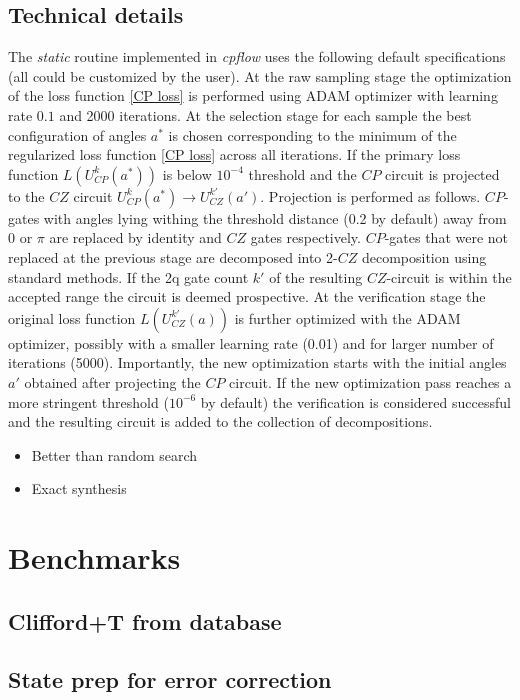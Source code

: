 \documentclass[amsfonts, amssymb, aps, nofootinbib]{revtex4-2}
\newcommand{\cpflow}{\textit{cpflow }}
\begin{document}
\subsection{Technical details}
The \textit{static} routine implemented in \cpflow uses the following default specifications (all could be customized by the user). At the raw sampling stage the optimization of the loss function \eqref{CP loss} is performed using ADAM\cite{} optimizer with learning rate $0.1$ and 2000 iterations. At the selection stage for each sample the best configuration of angles $a^*$ is chosen corresponding to the minimum of the regularized loss function \eqref{CP loss} across all iterations. If the primary loss function $L(U_{CP}^k(a^*))$ is below $10^{-4}$ threshold and the $CP$ circuit is projected to the $CZ$ circuit $U_{CP}^k(a^*)\to U_{CZ}^{k'}(a')$. Projection is performed as follows. $CP$-gates with angles lying withing the threshold distance (0.2 by default) away from $0$ or $\pi$ are replaced by identity and $CZ$ gates respectively.  $CP$-gates that were not replaced at the previous stage are decomposed into 2-$CZ$ decomposition using standard methods. If the 2q gate count $k'$ of the resulting $CZ$-circuit is within the accepted range the circuit is deemed prospective. At the verification stage the original loss function $L(U_{CZ}^{k'}(a))$ is further optimized with the ADAM optimizer, possibly with a smaller learning rate (0.01) and for larger number of iterations (5000). Importantly, the new optimization starts with the initial angles $a'$ obtained after projecting the $CP$ circuit. If the new optimization pass reaches a more stringent threshold ($10^{-6}$ by default) the verification is considered successful and the resulting circuit is added to the collection of decompositions.



\begin{itemize}
	\item Better than random search
	\item Exact synthesis
\end{itemize}
\section{Benchmarks}
\subsection{Clifford+T from database}
\subsection{State prep for error correction}
\end{document}
